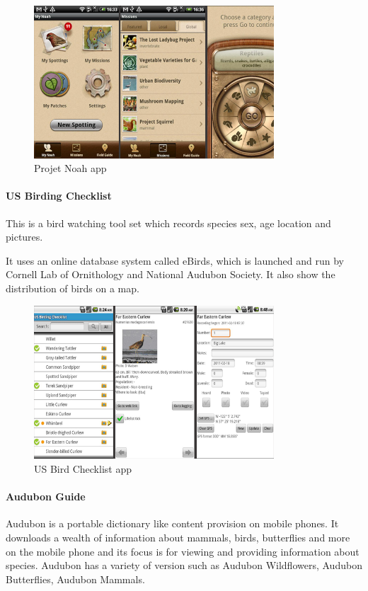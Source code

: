 \begin{figure}[htb]
    \centering
    \includegraphics[width=0.8\textwidth]{introduction/project_description/noah.png}
    \caption{Projet Noah app}
    \label{fig:Noahapp}
\end{figure}

\paragraph{US Birding Checklist}
This is a bird watching tool set which records species sex, age location and pictures\cite{similarproduct:usbird}.

It uses an online database system called eBirds\cite{similarproduct:ebird}, which is launched and run by Cornell Lab of Ornithology and National Audubon Society. It also show the distribution of birds on a map.

\begin{figure}[htb]
    \centering
    \includegraphics[width=0.8\textwidth]{introduction/project_description/USBirdingChecklist.png}
    \caption{US Bird Checklist app}
    \label{fig:usbirdapp}
\end{figure}

\paragraph{Audubon Guide}
Audubon is a portable dictionary like content provision on mobile phones. It downloads a wealth of information about mammals, birds, butterflies and more on the mobile phone and its focus is for viewing and providing information about species\cite{similarproduct:audubon}. Audubon has a variety of version such as Audubon Wildflowers, Audubon Butterflies, Audubon Mammals.

